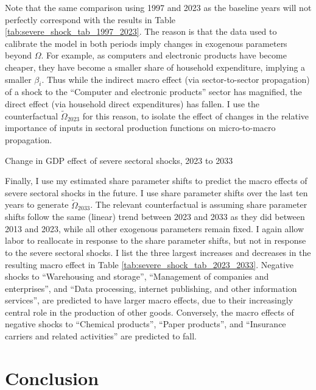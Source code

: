 \documentclass[11pt]{article}
\begin{document}
Note that the same comparison using 1997 and 2023 as the baseline years will not perfectly correspond with the results in Table \ref{tab:severe_shock_tab_1997_2023}. The reason is that the data used to calibrate the model in both periods imply changes in exogenous parameters beyond $\Omega$. For example, as computers and electronic products have become cheaper, they have become a smaller share of household expenditure, implying a smaller $\beta_i$. Thus while the indirect macro effect (via sector-to-sector propagation) of a shock to the ``Computer and electronic products'' sector has magnified, the direct effect (via household direct expenditures) has fallen. I use the counterfactual $\tilde{\Omega}_{2023}$ for this reason, to isolate the effect of changes in the relative importance of inputs in sectoral production functions on micro-to-macro propagation. 

\begin{table}[!h]
    \centering 
    \caption{Change in GDP effect of severe sectoral shocks, 2023 to 2033}
    \label{tab:severe_shock_tab_2023_2033}
    
\end{table}

Finally, I use my estimated share parameter shifts to predict the macro effects of severe sectoral shocks in the future. I use share parameter shifts over the last ten years to generate $\tilde{\Omega}_{2033}$. The relevant counterfactual is assuming share parameter shifts follow the same (linear) trend between 2023 and 2033 as they did between 2013 and 2023, while all other exogenous parameters remain fixed. I again allow labor to reallocate in response to the share parameter shifts, but not in response to the severe sectoral shocks. I list the three largest increases and decreases in the resulting macro effect in Table \ref{tab:severe_shock_tab_2023_2033}. Negative shocks to ``Warehousing and storage'', ``Management of companies and enterprises'', and ``Data processing, internet publishing, and other information services'', are predicted to have larger macro effects, due to their increasingly central role in the production of other goods. Conversely, the macro effects of negative shocks to ``Chemical products'', ``Paper products'', and ``Insurance  carriers and related activities'' are predicted to fall. 



\section*{Conclusion}
\end{document}
